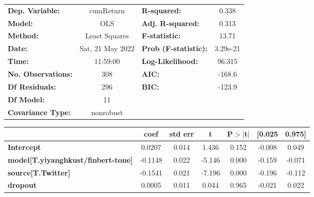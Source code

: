 \begin{center}
\begin{tabular}{lclc}
\toprule
\textbf{Dep. Variable:}                    &    cumReturn     & \textbf{  R-squared:         } &     0.338   \\
\textbf{Model:}                            &       OLS        & \textbf{  Adj. R-squared:    } &     0.313   \\
\textbf{Method:}                           &  Least Squares   & \textbf{  F-statistic:       } &     13.71   \\
\textbf{Date:}                             & Sat, 21 May 2022 & \textbf{  Prob (F-statistic):} &  3.29e-21   \\
\textbf{Time:}                             &     11:59:00     & \textbf{  Log-Likelihood:    } &    96.315   \\
\textbf{No. Observations:}                 &         308      & \textbf{  AIC:               } &    -168.6   \\
\textbf{Df Residuals:}                     &         296      & \textbf{  BIC:               } &    -123.9   \\
\textbf{Df Model:}                         &          11      & \textbf{                     } &             \\
\textbf{Covariance Type:}                  &    nonrobust     & \textbf{                     } &             \\
\bottomrule
\end{tabular}
\begin{tabular}{lcccccc}
                                           & \textbf{coef} & \textbf{std err} & \textbf{t} & \textbf{P$> |$t$|$} & \textbf{[0.025} & \textbf{0.975]}  \\
\midrule
\textbf{Intercept}                         &       0.0207  &        0.014     &     1.436  &         0.152        &       -0.008    &        0.049     \\
\textbf{model[T.yiyanghkust/finbert-tone]} &      -0.1148  &        0.022     &    -5.146  &         0.000        &       -0.159    &       -0.071     \\
\textbf{source[T.Twitter]}                 &      -0.1541  &        0.021     &    -7.196  &         0.000        &       -0.196    &       -0.112     \\
\textbf{dropout}                           &       0.0005  &        0.011     &     0.044  &         0.965        &       -0.021    &        0.022     \\

\end{tabular}
\end{center}
